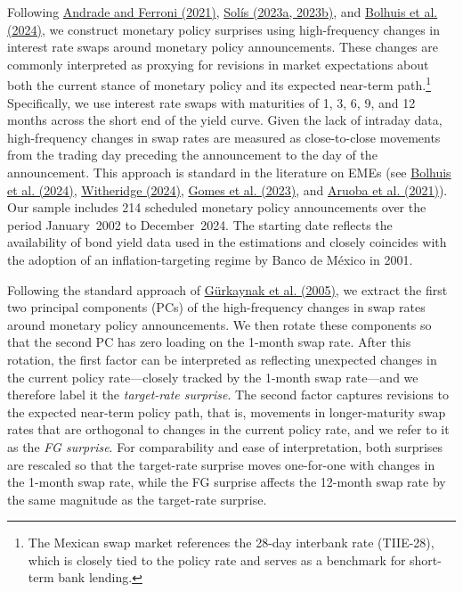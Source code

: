 \documentclass[12pt, reqno]{article}
\begin{document}
Following \hyperlink{Andrade and Ferroni (2021)}{Andrade and Ferroni (2021)}, \hyperlink{Solis (2023a)}{Solís (2023a, 2023b)}, and \hyperlink{Bolhuis et al. (2024)}{Bolhuis et al. (2024)}, we construct monetary policy surprises using high-frequency changes in interest rate swaps around monetary policy announcements. These changes are commonly interpreted as proxying for revisions in market expectations about both the current stance of monetary policy and its expected near-term path.\footnote{The Mexican swap market references the 28-day interbank rate (TIIE-28), which is closely tied to the policy rate and serves as a benchmark for short-term bank lending.} Specifically, we use interest rate swaps with maturities of 1, 3, 6, 9, and 12 months across the short end of the yield curve. Given the lack of intraday data, high-frequency changes in swap rates are measured as close-to-close movements from the trading day preceding the announcement to the day of the announcement. This approach is standard in the literature on EMEs (see \hyperlink{Bolhuis et al. (2024)}{Bolhuis et al. (2024)}, \hyperlink{Witheridge (2024)}{Witheridge (2024)}, \hyperlink{Gomes et al. (2023)}{Gomes et al. (2023)}, and \hyperlink{Aruoba et al. (2021)}{Aruoba et al. (2021)}). Our sample includes 214 scheduled monetary policy announcements over the period January~2002 to December~2024. The starting date reflects the availability of bond yield data used in the estimations and closely coincides with the adoption of an inflation-targeting regime by Banco de México in 2001.

Following the standard approach of \hyperlink{Gürkaynak et al. (2005)}{Gürkaynak et al. (2005)}, we extract the first two principal components (PCs) of the high-frequency changes in swap rates around monetary policy announcements. We then rotate these components so that the second PC has zero loading on the 1-month swap rate. After this rotation, the first factor can be interpreted as reflecting unexpected changes in the current policy rate—closely tracked by the 1-month swap rate—and we therefore label it the \emph{target-rate surprise}. The second factor captures revisions to the expected near-term policy path, that is, movements in longer-maturity swap rates that are orthogonal to changes in the current policy rate, and we refer to it as the \emph{FG surprise}. For comparability and ease of interpretation, both surprises are rescaled so that the target-rate surprise moves one-for-one with changes in the 1-month swap rate, while the FG surprise affects the 12-month swap rate by the same magnitude as the target-rate surprise.
\end{document}
